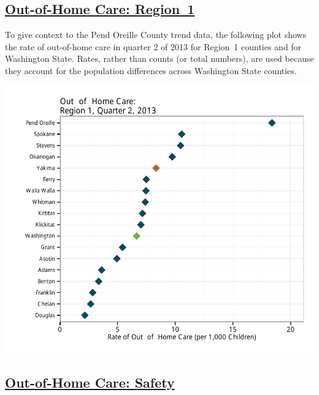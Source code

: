 \documentclass{article}\usepackage[]{graphicx}\usepackage[]{color}
\makeatletter
\def\maxwidth{ %
  \ifdim\Gin@nat@width>\linewidth
    \linewidth
  \else
    \Gin@nat@width
  \fi
}
\newenvironment{knitrout}{}{} %
\makeatother
\begin{document}
\begin{minipage}{\textwidth}
\subsection{\href{http://www.partnersforourchildren.org/child-well-being/visualizations/out-home-care/trends}
    {Out-of-Home Care: Region~1}
}
To give context to the Pend Oreille County trend data, the following plot shows the rate of out-of-home care in quarter 2 of 2013 for Region~1 counties and for Washington State. Rates, rather than counts (or total numbers), are used because they account for the population differences across Washington State counties.\\[1pt]
\begin{knitrout}
\color{fgcolor}

{\centering \includegraphics[width=\maxwidth]{figure/ooh_context} 

}



\end{knitrout}

\end{minipage}
\newpage

\subsection{\href{http://www.partnersforourchildren.org/child-well-being/visualizations/out-home-care/safety}
    {Out-of-Home Care: Safety}
}
\end{document}
